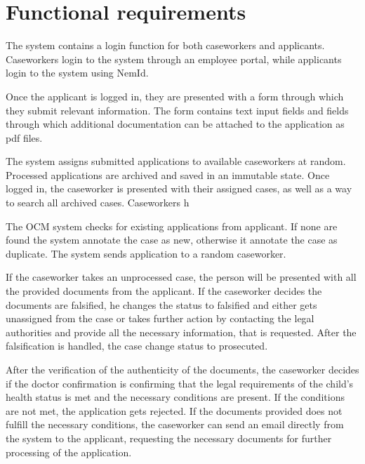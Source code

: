 \newpage
\section{Functional requirements}

The system contains a login function for both caseworkers and applicants. Caseworkers login to the system through an employee portal, while applicants login to the system using NemId.

\vspace{2mm}

Once the applicant is logged in, they are presented with a form through which they submit relevant information. The form contains text input fields and fields through which additional documentation can be attached to the application as pdf files.

\vspace{2mm}

The system assigns submitted applications to available caseworkers at random. Processed applications are archived and saved in an immutable state. Once logged in, the caseworker is presented with their assigned cases, as well as a way to search all archived cases. Caseworkers h

\vspace{2mm}

\vspace{2mm}

The OCM system checks for existing applications from applicant. If none are found the system annotate the case as new, otherwise it annotate the case as duplicate. The system sends application to a random caseworker.

\vspace{2mm}

If the caseworker takes an unprocessed case, the person will be presented with all the provided documents from the applicant. If the caseworker decides the documents are falsified, he changes the status to falsified and either gets unassigned from the case or takes further action by contacting the legal authorities and provide all the necessary information, that is requested. After the falsification is handled, the case change status to prosecuted.

After the verification of the authenticity of the documents, the caseworker decides if the doctor confirmation is confirming that the legal requirements of the child's health status is met and the necessary conditions are present. 
If the conditions are not met, the application gets rejected. 
If the documents provided does not fulfill the necessary conditions, the caseworker can send an email directly from the system to the applicant, requesting the necessary documents for further processing of the application.

